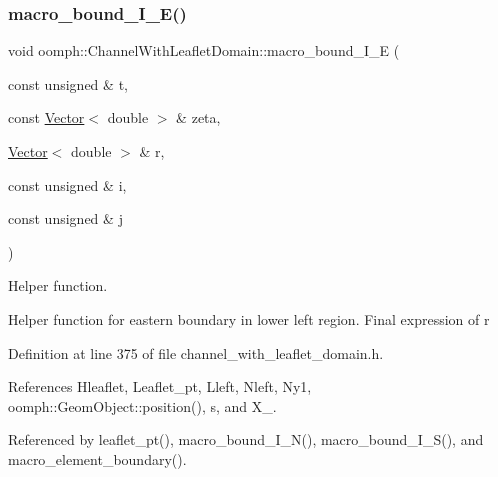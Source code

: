 \subsubsection{\texorpdfstring{macro\+\_\+bound\+\_\+\+I\+\_\+\+E()}{macro\_bound\_I\_E()}}
{\footnotesize\ttfamily void oomph\+::\+Channel\+With\+Leaflet\+Domain\+::macro\+\_\+bound\+\_\+\+I\+\_\+E (\begin{DoxyParamCaption}\item[{const unsigned \&}]{t,  }\item[{const \hyperlink{classoomph_1_1Vector}{Vector}$<$ double $>$ \&}]{zeta,  }\item[{\hyperlink{classoomph_1_1Vector}{Vector}$<$ double $>$ \&}]{r,  }\item[{const unsigned \&}]{i,  }\item[{const unsigned \&}]{j }\end{DoxyParamCaption})\hspace{0.3cm}{\ttfamily [protected]}}



Helper function. 

Helper function for eastern boundary in lower left region. Final expression of r 

Definition at line 375 of file channel\+\_\+with\+\_\+leaflet\+\_\+domain.\+h.



References Hleaflet, Leaflet\+\_\+pt, Lleft, Nleft, Ny1, oomph\+::\+Geom\+Object\+::position(), s, and X\+\_.



Referenced by leaflet\+\_\+pt(), macro\+\_\+bound\+\_\+\+I\+\_\+\+N(), macro\+\_\+bound\+\_\+\+I\+\_\+\+S(), and macro\+\_\+element\+\_\+boundary().

\mbox{\label{classoomph_1_1ChannelWithLeafletDomain_a08d97680e95f42a385a869d5c384e610}} 
